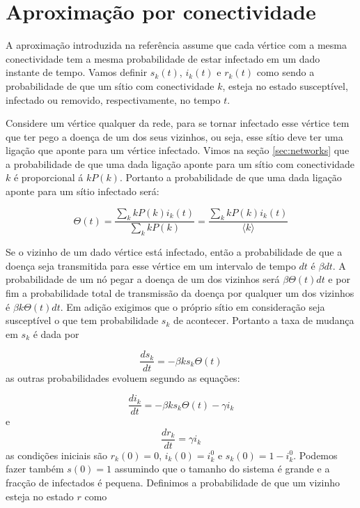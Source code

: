 \documentclass[a4paper,11pt]{report}
\begin{document}
\section{Aproxima\c{c}\~ao por conectividade}

A aproxima\c{c}\~ao introduzida na refer\^encia \cite{MORENO:2002bb} assume que cada v\'ertice com a mesma conectividade tem a mesma probabilidade de estar infectado em um dado instante de tempo. Vamos definir $s_k(t)$, $i_k(t)$ e $r_k(t)$ como sendo a probabilidade de que um s\'itio com conectividade $k$, esteja no estado suscept\'ivel, infectado ou removido, respectivamente, no tempo $t$.

Considere um v\'ertice qualquer da rede, para se tornar infectado esse v\'ertice tem que ter pego a doen\c{c}a de um dos seus vizinhos, ou seja, esse s\'itio deve ter uma liga\c{c}\~ao que aponte para um v\'ertice infectado. Vimos na se\c{c}\~ao \ref{sec:networks} que a probabilidade de que uma dada liga\c{c}\~ao aponte para um s\'itio com conectividade $k$ \'e proporcional \'a $kP(k)$. Portanto a probabilidade de que uma dada liga\c{c}\~ao aponte para um s\'itio infectado ser\'a:

\begin{equation}
\Theta(t)=\frac{\sum_k k P(k)i_k(t)}{\sum_k k P(k)}=\frac{\sum_k kP(k)i_k(t)}{\langle k\rangle}	
\end{equation}

Se o vizinho de um dado v\'ertice est\'a infectado, ent\~ao a probabilidade de que a doen\c{c}a seja transmitida para esse v\'ertice em um intervalo de tempo $dt$ \'e $\beta dt$. A probabilidade de um n\'o pegar a doen\c{c}a de um dos vizinhos ser\'a $\beta \Theta(t)dt$ e por fim a probabilidade total de transmiss\~ao da doen\c{c}a por qualquer um dos vizinhos \'e $\beta k\Theta(t)dt$. Em adi\c{c}\~ao exigimos que o pr\'oprio s\'itio em considera\c{c}\~ao seja suscept\'ivel o que tem probabilidade $s_k$ de acontecer. Portanto a taxa de mudan\c{c}a em $s_k$ \'e dada por

\begin{equation}
\frac{ds_k}{dt}=-\beta ks_k\Theta(t)
\label{eq:suc-degree}
\end{equation}
as outras probabilidades evoluem segundo as equa\c{c}\~oes:

\begin{equation}
\frac{di_k}{dt}=-\beta ks_k\Theta(t)-\gamma i_k
\end{equation}
e 
\begin{equation}
\frac{dr_k}{dt}=\gamma i_k
\end{equation}
as condi\c{c}\~oes iniciais s\~ao $r_k(0)=0$, $i_k(0)=i_k^0$ e $s_k(0)=1-i_k^0$.  Podemos fazer tamb\'em $s(0)=1$ assumindo que o tamanho do sistema \'e grande e a frac\c{c}\~ao de infectados \'e pequena. Definimos a probabilidade de que um vizinho esteja no estado $r$ como
\end{document}
